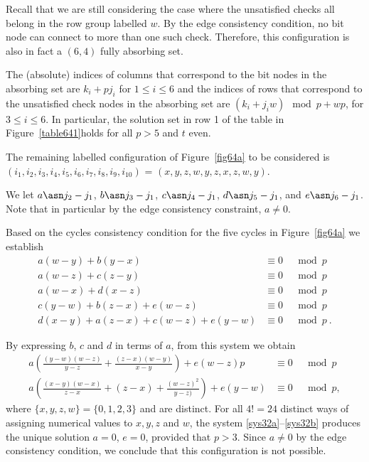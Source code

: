 Recall that we are still considering the case where the unsatisfied
checks all belong in the row group labelled $w$. By the edge
consistency condition, no bit node can connect to more than one such
check. Therefore, this configuration is also in fact a $(6,4)$ fully
absorbing set.

The (absolute) indices of columns that correspond to the bit nodes
in the absorbing set are $k_i+pj_i$ for $1 \leq i \leq 6$ and the
indices of rows that correspond to the unsatisfied check nodes in
the absorbing set are $(k_i+j_iw) \mod p+ wp$, for $3\leq i \leq 6$.
In particular, the solution set in row 1 of the table in
Figure~\ref{table641}holds for all $p
> 5$ and $t$ even.


 The remaining labelled configuration of Figure~\ref{fig64a} to be considered is
$(i_1,i_2,i_3,i_4,i_5,i_6,i_7,i_8,i_9,i_{10})$ =
$(x,y,z,w,y,z,x,z,w,y)$.

We let $a \asn j_2-j_1$, $b \asn j_3-j_1$, $c \asn j_4-j_1$,
 $d \asn j_5-j_1$, and $e \asn j_6-j_1$.  Note that in particular
 by the edge consistency constraint, $a \neq 0$.

Based on the cycles consistency condition for the five cycles in
Figure~\ref{fig64a} we establish
 \begin{equation}\label{sys31}\begin{array}{cccc}
 a(w-y)+b(y-x) &\equiv 0 &\mod p\\
 a(w-z)+c(z-y) &\equiv 0 &\mod p\\
 a(w-x)+d(x-z) &\equiv 0 &\mod p\\
 c(y-w)+b(z-x)+e(w-z) &\equiv 0 &\mod p\\
 d(x-y)+a(z-x)+c(w-z)+e(y-w)&\equiv 0 &\mod p~.
 \end{array}
 \end{equation}



By expressing $b$, $c$ and $d$ in terms of $a$, from this system
we obtain
\begin{eqnarray}\label{sys32a}
a\left(\frac{(y-w)(w-z)}{y-z}+\frac{(z-x)(w-y)}{x-y} \right)+e(w-z)p &\equiv 0 &\mod p\\
\label{sys32b}a\left(\frac{(x-y)(w-x)}{z-x}+(z-x)+\frac{(w-z)^2}{y-z)}
\right)+e(y-w)&\equiv 0 &\mod p,
\end{eqnarray}
where $\{x,y,z,w\} =\{0,1,2,3\}$ and are distinct. For all $4!=24$
distinct ways of assigning numerical values to $x,y,z$ and $w$, the
system \eqref{sys32a}--\eqref{sys32b} produces the unique solution
$a=0$, $e=0$, provided that $p>3$. Since $a\neq 0$ by the edge
consistency condition, we conclude that this configuration is not
possible.

